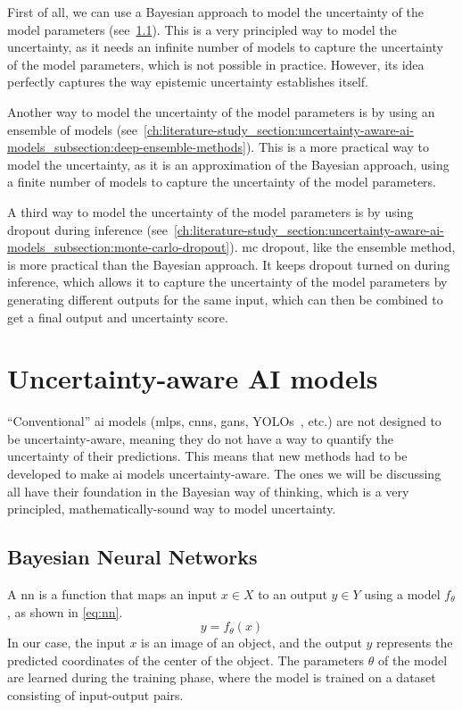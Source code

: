 First of all, we can use a Bayesian approach to model the uncertainty of the model parameters (see~\cref{ch:literature-study_section:uncertainty-aware-ai-models_subsection:bayesian-neural-networks}).
This is a very principled way to model the uncertainty, as it needs an infinite number of models to capture the uncertainty of the model parameters, which is not possible in practice. 
However, its idea perfectly captures the way epistemic uncertainty establishes itself.

Another way to model the uncertainty of the model parameters is by using an ensemble of models (see~\cref{ch:literature-study_section:uncertainty-aware-ai-models_subsection:deep-ensemble-methods}).
This is a more practical way to model the uncertainty, as it is an approximation of the Bayesian approach, using a finite number of models to capture the uncertainty of the model parameters.

A third way to model the uncertainty of the model parameters is by using dropout during inference (see~\cref{ch:literature-study_section:uncertainty-aware-ai-models_subsection:monte-carlo-dropout}).
\gls{mc} dropout, like the ensemble method, is more practical than the Bayesian approach.
It keeps dropout turned on during inference, which allows it to capture the uncertainty of the model parameters by generating different outputs for the same input, which can then be combined to get a final output and uncertainty score.

\section{Uncertainty-aware AI models} \label{ch:literature-study_section:uncertainty-aware-ai-models}
``Conventional'' \gls{ai} models (\glspl{mlp}, \glspl{cnn}, \glspl{gan}, YOLOs~\cite{src:yolo}, etc.) are not designed to be uncertainty-aware, meaning they do not have a way to quantify the uncertainty of their predictions.
This means that new methods had to be developed to make \gls{ai} models uncertainty-aware.
The ones we will be discussing all have their foundation in the Bayesian way of thinking, which is a very principled, mathematically-sound way to model uncertainty.

\subsection{Bayesian Neural Networks} \label{ch:literature-study_section:uncertainty-aware-ai-models_subsection:bayesian-neural-networks}
A \gls{nn} is a function that maps an input $x \in X$ to an output $y \in Y$ using a model $f_{\theta}$, as shown in \cref{eq:nn}.
\begin{equation}
    y = f_{\theta}(x)
    \label{eq:nn}
\end{equation}
In our case, the input $x$ is an image of an object, and the output $y$ represents the predicted coordinates of the center of the object.
The parameters $\theta$ of the model are learned during the training phase, where the model is trained on a dataset consisting of input-output pairs.

